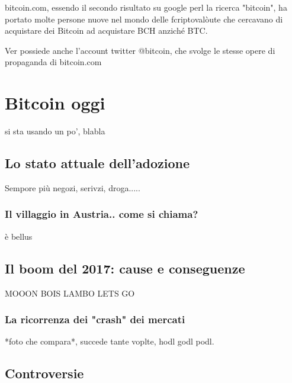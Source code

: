 \documentclass {article}
\begin{document}
bitcoin.com, essendo il secondo risultato su google perl la ricerca "bitcoin", ha portato molte persone nuove nel mondo delle fcriptovalòute che cercavano di acquistare dei Bitcoin ad acquistare BCH anziché BTC.

Ver possiede anche l'account twitter @bitcoin, che svolge le stesse opere di propaganda di bitcoin.com



\section {Bitcoin oggi}



si sta usando un po', blabla



\subsection {Lo stato attuale dell'adozione}



Sempore più negozi, serivzi, droga.....



\subsubsection {Il villaggio in Austria.. come si chiama?}



è bellus



\subsection {Il boom del 2017: cause e conseguenze}



MOOON BOIS LAMBO LETS GO



\subsubsection {La ricorrenza dei "crash" dei mercati}



*foto che compara*, succede tante voplte, hodl godl podl.



\subsection {Controversie}
\end{document}

